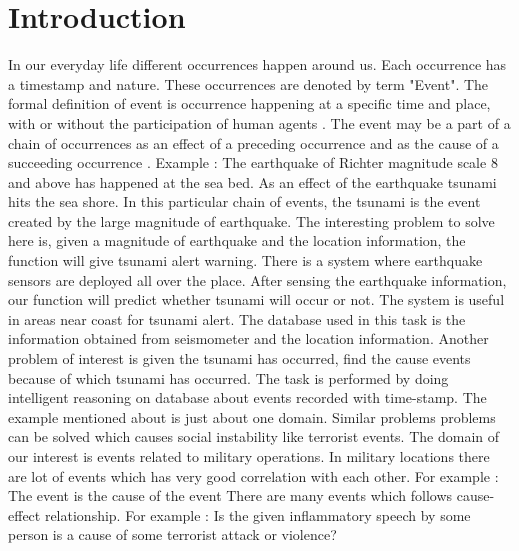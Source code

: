 \documentclass[journal,onecolumn,11pt]{IEEEtran}
\begin{document}
\section{Introduction}
\label{intro}
In our everyday life different occurrences happen around us. Each occurrence has a timestamp and nature. These occurrences are denoted by term "Event". The formal definition of event is occurrence happening at a specific time and place, with or without the participation of human agents . The event may be a part of a chain of occurrences as an effect of a preceding occurrence and as the cause of a succeeding occurrence \cite{def}.
Example : The earthquake of Richter magnitude scale 8 and above has happened at the sea bed. As an effect of the earthquake tsunami hits the sea shore.
In this particular chain of events, the tsunami is the event created by the large magnitude of earthquake.
 The interesting problem to solve here is, given a magnitude of earthquake and the location information, the function will give tsunami alert warning. There is a system where earthquake sensors are deployed all over the place. After sensing the earthquake information, our function will predict whether tsunami will occur or not. The system is useful in areas near coast for tsunami alert. The database used in this task is the information obtained from seismometer and the location information. Another problem of interest is given the tsunami has occurred, find the cause events because of which tsunami has occurred. The task is performed by doing intelligent reasoning on database about events recorded with time-stamp. The example mentioned about is just about one domain. Similar problems problems can be solved which causes social instability like terrorist events. The domain of our interest is events related to military operations. In military locations there are lot of events which has very good correlation with each other. For example : The event  is the cause of the event  There are many events which follows cause-effect relationship. For example : Is the given inflammatory speech by some person is a cause of some terrorist attack or violence?
\end{document}
